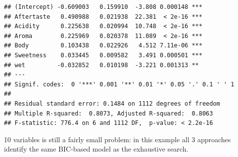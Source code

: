 \documentclass[oneside]{book}\usepackage[]{graphicx}\usepackage[dvipsnames,table,xcdraw]{xcolor}
\makeatletter
\newenvironment{kframe}{%
 \def\at@end@of@kframe{}%
 \ifinner\ifhmode%
  \def\at@end@of@kframe{\end{minipage}}%
  \begin{minipage}{\columnwidth}%
 \fi\fi%
 \def\FrameCommand##1{\hskip\@totalleftmargin \hskip-\fboxsep
 \colorbox{shadecolor}{##1}\hskip-\fboxsep
     \hskip-\linewidth \hskip-\@totalleftmargin \hskip\columnwidth}%
 \MakeFramed {\advance\hsize-\width
   \@totalleftmargin\z@ \linewidth\hsize
   \@setminipage}}%
 {\par\unskip\endMakeFramed%
 \at@end@of@kframe}
\newenvironment{knitrout}{}{} %
\makeatother
\begin{document}
\begin{knitrout}
\begin{kframe}
\begin{verbatim}
## (Intercept) -0.609003   0.159910  -3.808 0.000148 ***
## Aftertaste   0.490988   0.021938  22.381  < 2e-16 ***
## Acidity      0.225638   0.020994  10.748  < 2e-16 ***
## Aroma        0.225969   0.020378  11.089  < 2e-16 ***
## Body         0.103438   0.022926   4.512 7.11e-06 ***
## Sweetness    0.033445   0.009582   3.491 0.000501 ***
## wet         -0.032852   0.010198  -3.221 0.001313 ** 
## ---
## Signif. codes:  0 '***' 0.001 '**' 0.01 '*' 0.05 '.' 0.1 ' ' 1
## 
## Residual standard error: 0.1484 on 1112 degrees of freedom
## Multiple R-squared:  0.8073,	Adjusted R-squared:  0.8063 
## F-statistic: 776.4 on 6 and 1112 DF,  p-value: < 2.2e-16
\end{verbatim}
\end{kframe}
\end{knitrout}

10 variables is still a fairly small problem:
in this example all 3 approaches identify the same BIC-based model as
the exhaustive search.

\end{document}
